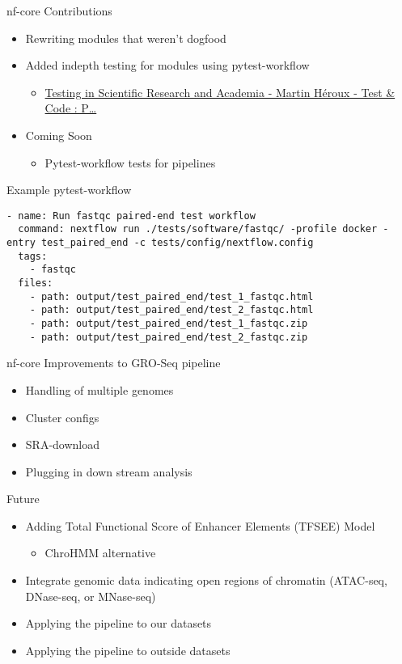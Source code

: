 \documentclass[bigger]{beamer}
\begin{document}
\begin{frame}[label={sec:org73b8698}]{nf-core Contributions}
\begin{itemize}
\item Rewriting modules that weren't dogfood
\item Added indepth testing for modules using pytest-workflow
\begin{itemize}
\item \href{https://pca.st/xdutlokp}{Testing in Scientific Research and Academia - Martin Héroux - Test \& Code : P\ldots{}}
\end{itemize}
\item Coming Soon
\begin{itemize}
\item Pytest-workflow tests for pipelines
\end{itemize}
\end{itemize}
\end{frame}

\begin{frame}[label={sec:orgfa2c0e9},fragile]{Example pytest-workflow}
 \begin{verbatim}
- name: Run fastqc paired-end test workflow
  command: nextflow run ./tests/software/fastqc/ -profile docker -entry test_paired_end -c tests/config/nextflow.config
  tags:
    - fastqc
  files:
    - path: output/test_paired_end/test_1_fastqc.html
    - path: output/test_paired_end/test_2_fastqc.html
    - path: output/test_paired_end/test_1_fastqc.zip
    - path: output/test_paired_end/test_2_fastqc.zip
\end{verbatim}
\end{frame}

\begin{frame}[label={sec:orgcbca0bd}]{nf-core Improvements to GRO-Seq pipeline}
\begin{itemize}
\item Handling of multiple genomes
\item Cluster configs
\item SRA-download
\item Plugging in down stream analysis
\end{itemize}
\end{frame}

\begin{frame}[label={sec:org20fb08e}]{Future}
\begin{itemize}
\item Adding Total Functional Score of Enhancer Elements (TFSEE) Model
\begin{itemize}
\item ChroHMM alternative
\end{itemize}
\item Integrate genomic data indicating open regions of chromatin (ATAC-seq,
DNase-seq, or MNase-seq)
\item Applying the pipeline to our datasets
\item Applying the pipeline to outside datasets
\end{itemize}
\end{frame}
\end{document}
